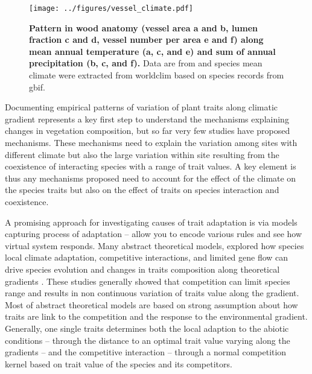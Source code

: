 \documentclass[a4paper,11pt]{article}
\begin{document}
\begin{figure}[ht]
\centering
\texttt{[image: ../figures/vessel\_climate.pdf]}
\caption{\textbf{Pattern in wood anatomy (vessel area a and b, lumen fraction c and d, vessel number per area e and f) along mean annual temperature (a, c, and e) and sum of annual precipitation (b, c, and f).}
Data are from \citep{Zanne-2010} and species mean climate were extracted from worldclim based on species records from gbif.
\label{fig:vesselpattern}}
\end{figure}

\clearpage


Documenting empirical patterns of variation of plant traits along climatic gradient represents a key first step to understand the mechanisms explaining changes in vegetation composition, but so far very few studies have proposed mechanisms. These mechanisms need to explain the variation among sites with different climate but also the large variation within site resulting from the coexistence of interacting species with a range of trait values. A key element is thus any mechanisms proposed need to account for the effect of the climate on the species traits but also on the effect of traits on species interaction and coexistence.

A promising approach for investigating causes of trait adaptation is via models capturing process of adaptation -- allow you to encode various rules and see how virtual system responds. Many abstract theoretical models, explored how species local climate adaptation, competitive interactions, and limited gene flow can drive species evolution and changes in traits composition along theoretical gradients \citep{Case-2000,Doebeli-2003,Goldberg-2006,Leimar-2008}. These studies generally showed that competition can limit species range and results in non continuous variation of traits value along the gradient. Most of abstract theoretical models are based on strong assumption about how traits are link to the competition and the response to the environmental gradient. Generally, one single traits determines both the local adaption to the abiotic conditions -- through the distance to an optimal trait value varying along the gradients -- and the competitive interaction -- through a normal competition kernel based on trait value of the species and its competitors.
\end{document}
